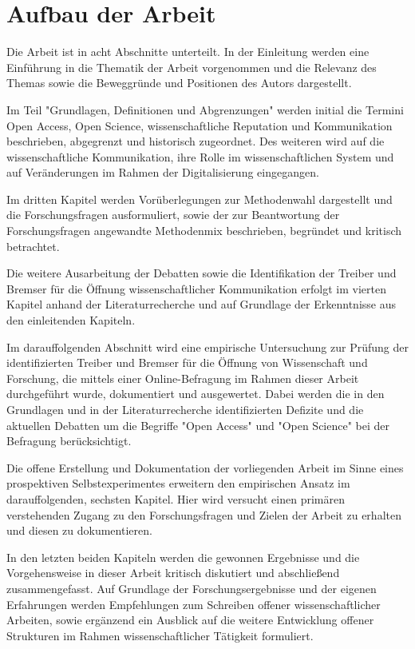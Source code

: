 \section{Aufbau der Arbeit}

Die Arbeit ist in acht Abschnitte unterteilt. In der Einleitung werden eine Einführung in die Thematik der Arbeit vorgenommen und die Relevanz des Themas sowie die Beweggründe und Positionen des Autors dargestellt.

Im Teil "Grundlagen, Definitionen und Abgrenzungen" werden initial die Termini Open Access, Open Science, wissenschaftliche Reputation und Kommunikation beschrieben, abgegrenzt und historisch zugeordnet. Des weiteren wird auf die wissenschaftliche Kommunikation, ihre Rolle im wissenschaftlichen System und auf Veränderungen im Rahmen der Digitalisierung eingegangen.

Im dritten Kapitel werden Vorüberlegungen zur Methodenwahl dargestellt und die Forschungsfragen ausformuliert, sowie der zur Beantwortung der Forschungsfragen angewandte Methodenmix beschrieben, begründet und kritisch betrachtet.

Die weitere Ausarbeitung der Debatten sowie die Identifikation der Treiber und Bremser für die Öffnung wissenschaftlicher Kommunikation erfolgt im vierten Kapitel anhand der Literaturrecherche und auf Grundlage der Erkenntnisse aus den einleitenden Kapiteln.

Im darauffolgenden Abschnitt wird eine empirische Untersuchung zur Prüfung der identifizierten Treiber und Bremser für die Öffnung von Wissenschaft und Forschung, die mittels einer Online-Befragung im Rahmen dieser Arbeit durchgeführt wurde, dokumentiert und ausgewertet. Dabei werden die in den Grundlagen und in der Literaturrecherche identifizierten Defizite und die aktuellen Debatten um die Begriffe "Open Access" und "Open Science" bei der Befragung berücksichtigt.

Die offene Erstellung und Dokumentation der vorliegenden Arbeit im Sinne eines prospektiven Selbstexperimentes erweitern den empirischen Ansatz im darauffolgenden, sechsten Kapitel. Hier wird versucht einen primären verstehenden Zugang zu den Forschungsfragen und Zielen der Arbeit zu erhalten und diesen zu dokumentieren.

In den letzten beiden Kapiteln werden die gewonnen Ergebnisse und die Vorgehensweise in dieser Arbeit kritisch diskutiert und abschließend zusammengefasst. Auf Grundlage der Forschungsergebnisse und der eigenen Erfahrungen werden Empfehlungen zum Schreiben offener wissenschaftlicher Arbeiten, sowie ergänzend ein Ausblick auf die weitere Entwicklung offener Strukturen im Rahmen wissenschaftlicher Tätigkeit formuliert.


